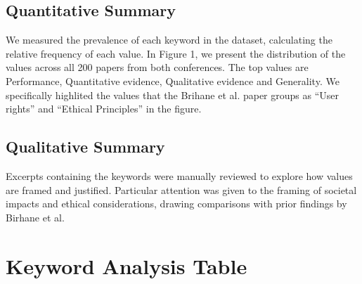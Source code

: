 \documentclass{article}
\begin{document}
\subsection{Quantitative Summary}
We measured the prevalence of each keyword in the dataset, calculating the relative frequency of each value. In Figure 1, we present the distribution of the values across all 200 papers from both conferences. The top values 
are Performance, Quantitative evidence, Qualitative evidence and Generality. We specifically highlited the values that the Brihane et al. paper groups as ``User rights'' and ``Ethical Principles'' in the figure.

\subsection{Qualitative Summary}
Excerpts containing the keywords were manually reviewed to explore how values are framed and justified. Particular attention was given to the framing of societal impacts and ethical considerations, drawing comparisons with prior findings by Birhane et al.





\appendix
\section{Keyword Analysis Table}
\end{document}
